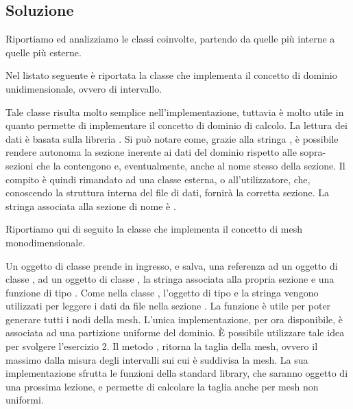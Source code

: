\subsection*{Soluzione}

Riportiamo ed analizziamo le classi coinvolte, partendo da
quelle pi\`u interne a quelle pi\`u esterne.

Nel listato seguente \`e riportata la classe che implementa
il concetto di dominio unidimensionale, ovvero di intervallo.

\lstset{basicstyle=\scriptsize\sf}
    
    
\lstset{basicstyle=\sf}

Tale classe risulta molto semplice nell'implementazione, tuttavia \`e
molto utile in quanto permette di implementare il concetto di dominio
di calcolo. La lettura dei dati \`e basata sulla libreria .
Si pu\`o notare come, grazie alla stringa , \`e possibile
rendere autonoma la sezione inerente ai dati del dominio rispetto alle
sopra-sezioni che la contengono e, eventualmente, anche al nome stesso
della sezione. Il compito \`e quindi rimandato ad una classe esterna,
o all'utilizzatore, che, conoscendo la struttura interna del file di
dati, fornir\`a la corretta sezione. La stringa associata alla sezione
di nome  \`e .

Riportiamo qui di seguito la classe che implementa il concetto di mesh
monodimensionale.

\lstset{basicstyle=\scriptsize\sf}
    
    
\lstset{basicstyle=\sf}

Un oggetto di classe  prende in ingresso, e salva, una
referenza ad un oggetto di classe , ad un oggetto di
classe , la stringa associata alla propria sezione e una
funzione di tipo . Come nella classe ,
l'oggetto di tipo  e la stringa  vengono
utilizzati per leggere i dati da file nella sezione .
La funzione  \`e utile per poter generare tutti i nodi
della mesh. L'unica implementazione, per ora disponibile, \`e associata
ad una partizione uniforme del dominio. \`E possibile utilizzare tale
idea per svolgere l'esercizio 2. Il metodo , ritorna la taglia
della mesh, ovvero il massimo dalla misura degli intervalli sui cui
\`e suddivisa la mesh. La sua implementazione sfrutta le funzioni
della standard library, che saranno oggetto di una prossima lezione,
e permette di calcolare la taglia anche per mesh non uniformi.

